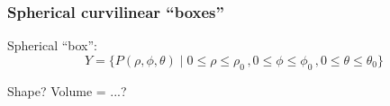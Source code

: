 \begin{frame}
\frametitle{Spherical curvilinear ``boxes''}






Spherical ``box'':
$$Y = \{ P(\rho, \phi, \theta) \; | \; 0 \leqslant \rho \leqslant \rho_0\, ,
0 \leqslant \phi \leqslant \phi_0\, ,
0 \leqslant \theta \leqslant \theta_0\}$$

\pause
Shape? \pause Volume = ...?

\end{frame}